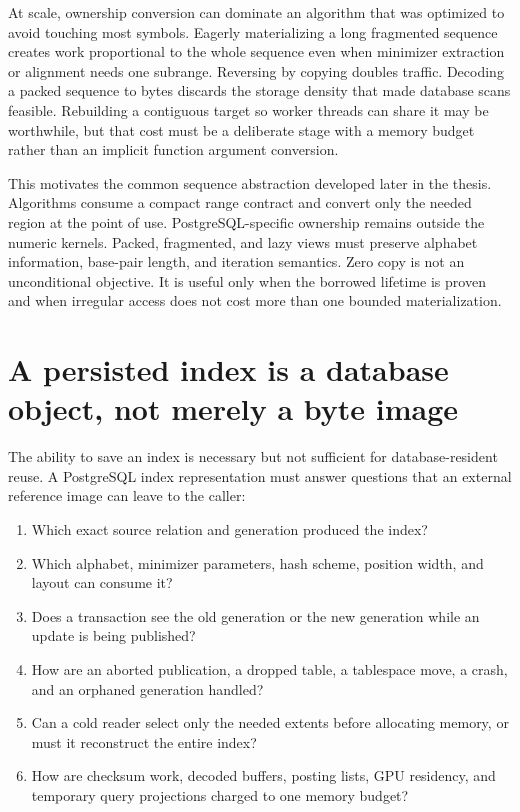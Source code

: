 At scale, ownership conversion can dominate an algorithm that was
optimized to avoid touching most symbols.  Eagerly materializing a long
fragmented sequence creates work proportional to the whole sequence even
when minimizer extraction or alignment needs one subrange.  Reversing by
copying doubles traffic.  Decoding a packed sequence to bytes discards
the storage density that made database scans feasible.  Rebuilding a
contiguous target so worker threads can share it may be worthwhile, but
that cost must be a deliberate stage with a memory budget rather than an
implicit function argument conversion.

This motivates the common sequence abstraction developed later in the
thesis.  Algorithms consume a compact range contract and convert only the
needed region at the point of use.  PostgreSQL-specific ownership remains
outside the numeric kernels.  Packed, fragmented, and lazy views must
preserve alphabet information, base-pair length, and iteration semantics.
Zero copy is not an unconditional objective.  It is useful only when the
borrowed lifetime is proven and when irregular access does not cost more
than one bounded materialization.

\section{A persisted index is a database object, not merely a byte image}
\label{sec:persistence-gap}

The ability to save an index is necessary but not sufficient for
database-resident reuse.  A PostgreSQL index representation must answer
questions that an external reference image can leave to the caller:

\begin{enumerate}
  \item Which exact source relation and generation produced the index?

  \item Which alphabet, minimizer parameters, hash scheme, position
  width, and layout can consume it?

  \item Does a transaction see the old generation or the new generation
  while an update is being published?

  \item How are an aborted publication, a dropped table, a tablespace
  move, a crash, and an orphaned generation handled?

  \item Can a cold reader select only the needed extents before allocating
  memory, or must it reconstruct the entire index?

  \item How are checksum work, decoded buffers, posting lists, GPU
  residency, and temporary query projections charged to one memory
  budget?
\end{enumerate}

